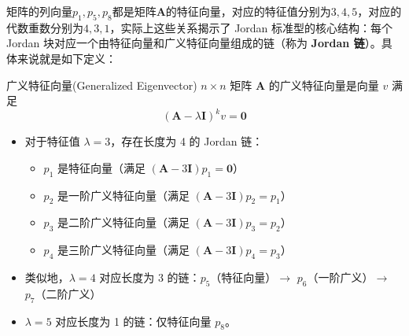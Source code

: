 矩阵的列向量$p_1,p_5,p_8$都是矩阵$\mathbf{A}$的特征向量，对应的特征值分别为$3,4,5$，对应的代数重数分别为$4,3,1$，实际上这些关系揭示了 Jordan 标准型的核心结构：每个 Jordan 块对应一个由特征向量和广义特征向量组成的链（称为 \textbf{Jordan 链}）。具体来说就是如下定义：

\begin{definition}{广义特征向量(Generalized Eigenvector)}
	$n\times n$ 矩阵 $\mathbf{A}$ 的广义特征向量是向量 $v$ 满足$$(\mathbf{A}-\lambda\mathbf{I})^k v=\boldsymbol{0}$$
\end{definition}

\begin{itemize}
	\item 对于特征值 $\lambda=3$，存在长度为 4 的 Jordan 链：
	\begin{itemize}
		\item $p_1$ 是特征向量（满足 $(\mathbf{A}-3\mathbf{I})p_1=\boldsymbol{0}$）
		\item $p_2$ 是一阶广义特征向量（满足 $(\mathbf{A}-3\mathbf{I})p_2=p_1$）
		\item $p_3$ 是二阶广义特征向量（满足 $(\mathbf{A}-3\mathbf{I})p_3=p_2$）
		\item $p_4$ 是三阶广义特征向量（满足 $(\mathbf{A}-3\mathbf{I})p_4=p_3$）
	\end{itemize}
	\item 类似地，$\lambda=4$ 对应长度为 3 的链：$p_5$（特征向量）$\rightarrow$ $p_6$（一阶广义）$\rightarrow$ $p_7$（二阶广义）
	\item $\lambda=5$ 对应长度为 1 的链：仅特征向量 $p_8$。
\end{itemize}

